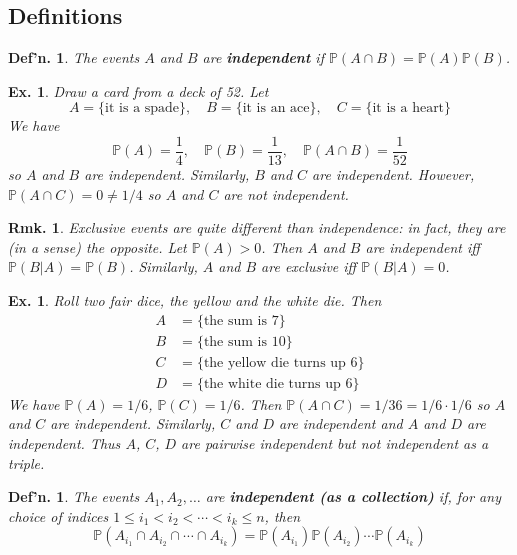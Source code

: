 \documentclass[12pt, a4paper]{book}
\renewcommand{\Pr}{\mathbb{P}}
\newtheorem{definition}[theorem]{Def'n.}
\newtheorem{remark}[theorem]{Rmk.}
\newtheorem{example}[theorem]{Ex.}
\theoremstyle{nonumberplain}
\begin{document}
\subsection{Definitions}
\begin{definition}
    The events $A$ and $B$ are \textbf{independent} if $\Pr(A\cap B)=\Pr(A)\Pr(B)$.
\end{definition}
\begin{example}
    Draw a card from a deck of 52.
    Let
    \[A=\{\text{it is a spade}\},\quad B=\{\text{it is an ace}\},\quad C=\{\text{it is a heart}\}\]
    We have
    \[\Pr(A)=\frac{1}{4},\quad\Pr(B)=\frac{1}{13},\quad\Pr(A\cap B)=\frac{1}{52}\]
    so $A$ and $B$ are independent.
    Similarly, $B$ and $C$ are independent.
    However, $\Pr(A\cap C)=0\neq 1/4$ so $A$ and $C$ are not independent.
\end{example}
\begin{remark}
    Exclusive events are quite different than independence: in fact, they are (in a sense) the opposite.
    Let $\Pr(A)>0$.
    Then $A$ and $B$ are independent iff $\Pr(B|A)=\Pr(B)$.
    Similarly, $A$ and $B$ are exclusive iff $\Pr(B|A)=0$.
\end{remark}
\begin{example}
    Roll two fair dice, the yellow and the white die.
    Then
    \begin{align*}
        A &= \{\text{the sum is 7}\}\\
        B &= \{\text{the sum is 10}\}\\
        C &= \{\text{the yellow die turns up 6}\}\\
        D &= \{\text{the white die turns up 6}\}
    \end{align*}
    We have $\Pr(A)=1/6$, $\Pr(C)=1/6$.
    Then $\Pr(A\cap C)=1/36=1/6\cdot 1/6$ so $A$ and $C$ are independent.
    Similarly, $C$ and $D$ are independent and $A$ and $D$ are independent.
    Thus $A$, $C$, $D$ are pairwise independent but not independent as a triple.
\end{example}
\begin{definition}
    The events $A_1,A_2,\ldots$ are \textbf{independent (as a collection)} if, for any choice of indices $1\leq i_1<i_2<\cdots<i_k\leq n$, then
    \[\Pr(A_{i_1}\cap A_{i_2}\cap\cdots\cap A_{i_k})=\Pr(A_{i_1})\Pr(A_{i_2})\cdots\Pr(A_{i_k})\]
\end{definition}
\end{document}
